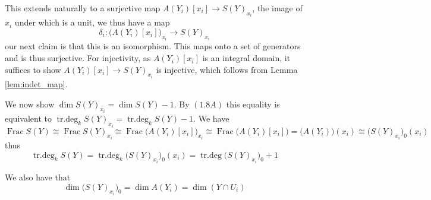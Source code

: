 \documentclass[12pt]{article}
\numberwithin{thm}{subsection}
\numberwithin{defn}{subsection}
\numberwithin{lemma}{subsection}
\numberwithin{example}{subsection}
\numberwithin{notation}{subsection}
\numberwithin{cor}{subsection}
\numberwithin{remark}{subsection}
\numberwithin{condition}{subsection}
\numberwithin{question}{subsection}
\numberwithin{construction}{subsection}
\numberwithin{construction}{subsection}
\numberwithin{construction}{subsection}
\newcommand{\lto}{\longrightarrow}
\begin{document}
This extends naturally to a surjective map $A(Y_i)[x_i] \lto S(Y)_{x_i}$, the image of $x_i$ under which is a unit, we thus have a map 
\[
    \delta_i: \big(A(Y_i)[x_i]\big)_{x_i} \lto S(Y)_{x_i}
\]
our next claim is that this is an isomorphism. This maps onto a set of generators and is thus surjective. For injectivity, as $A(Y_i)[x_i]$ is an integral domain, it suffices to show $A(Y_i)[x_i] \lto S(Y)_{x_i}$ is injective, which follows from Lemma \ref{lem:indet_map}.

We now show $\operatorname{dim}S(Y)_{x_i} = \operatorname{dim}S(Y) - 1$. By $(1.8A)$ this equality is equivalent to $\operatorname{tr.deg}_kS(Y)_{x_i} = \operatorname{tr.deg}_kS(Y) - 1$. We have
\[\operatorname{Frac}S(Y) \cong \operatorname{Frac}S(Y)_{x_i} \cong\operatorname{Frac}\big(A(Y_i)[x_i]\big)_{x_i} \cong \operatorname{Frac}\big(A(Y_i)[x_i]\big) = \big(A(Y_i)\big)(x_i) \cong \big(S(Y)_{x_i}\big)_0(x_i)\]
thus
\[\operatorname{tr.deg}_kS(Y) = \operatorname{tr.deg}_k\big(S(Y)_{x_i}\big)_0(x_i) = \operatorname{tr.deg}\big(S(Y)_{x_i}\big)_0 + 1\]

We also have that
\[\operatorname{dim}\big(S(Y)_{x_i}\big)_0 = \operatorname{dim}A(Y_i) = \operatorname{dim}(Y \cap U_i)\]
\end{document}
